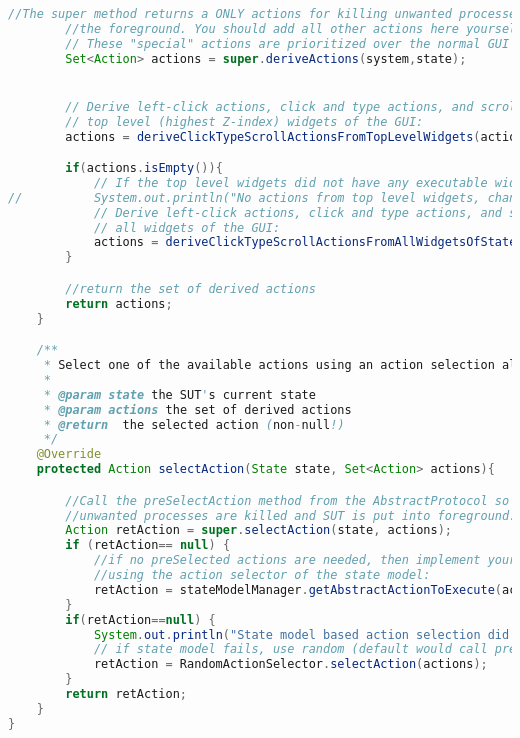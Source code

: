 \begin{lstlisting}[language=java, caption=Protocol for the experiment application, label=code:protocol-experiment]
		//The super method returns a ONLY actions for killing unwanted processes if needed, or bringing the SUT to
		//the foreground. You should add all other actions here yourself.
		// These "special" actions are prioritized over the normal GUI actions in selectAction() / preSelectAction().
		Set<Action> actions = super.deriveActions(system,state);


		// Derive left-click actions, click and type actions, and scroll actions from
		// top level (highest Z-index) widgets of the GUI:
		actions = deriveClickTypeScrollActionsFromTopLevelWidgets(actions, system, state);

		if(actions.isEmpty()){
			// If the top level widgets did not have any executable widgets, try all widgets:
//			System.out.println("No actions from top level widgets, changing to all widgets.");
			// Derive left-click actions, click and type actions, and scroll actions from
			// all widgets of the GUI:
			actions = deriveClickTypeScrollActionsFromAllWidgetsOfState(actions, system, state);
		}

		//return the set of derived actions
		return actions;
	}

	/**
	 * Select one of the available actions using an action selection algorithm (for example random action selection)
	 *
	 * @param state the SUT's current state
	 * @param actions the set of derived actions
	 * @return  the selected action (non-null!)
	 */
	@Override
	protected Action selectAction(State state, Set<Action> actions){

		//Call the preSelectAction method from the AbstractProtocol so that, if necessary,
		//unwanted processes are killed and SUT is put into foreground.
		Action retAction = super.selectAction(state, actions);
		if (retAction== null) {
			//if no preSelected actions are needed, then implement your own action selection strategy
			//using the action selector of the state model:
			retAction = stateModelManager.getAbstractActionToExecute(actions);
		}
		if(retAction==null) {
			System.out.println("State model based action selection did not find an action. Using random action selection.");
			// if state model fails, use random (default would call preSelectAction() again, causing double actions HTML report):
			retAction = RandomActionSelector.selectAction(actions);
		}
		return retAction;
	}
}
\end{lstlisting}